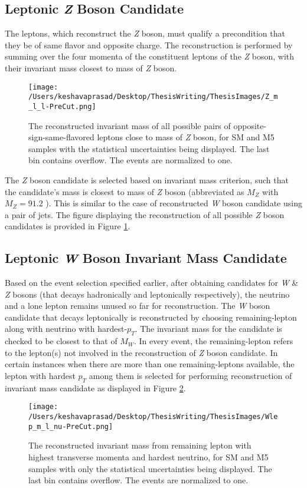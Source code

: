 \subsection{Leptonic \textit{Z} Boson Candidate}
 The leptons, which reconstruct the \textit{Z} boson, must qualify a precondition that they be of same flavor and opposite charge. The reconstruction is performed by summing over the four momenta of the constituent leptons of the \textit{Z} boson, with their invariant mass closest to mass of \textit{Z} boson.
\begin{figure}[!htb]%
	\centering
	\texttt{[image: /Users/keshavaprasad/Desktop/ThesisWriting/ThesisImages/Z\_m\_l\_l-PreCut.png]}
	\caption{The reconstructed invariant mass of all possible  pairs of opposite-sign-same-flavored leptons close to mass of \textit{Z} boson, for SM and M5 samples with the statistical uncertainties being displayed. The last bin contains overflow. The events are normalized to one.}
	\label{Z Candidate Mass-PreCut}
\end{figure}
The \textit{Z} boson candidate is selected based on invariant mass criterion, such that the candidate's mass is closest to mass of \textit{Z} boson (abbreviated as \texttt{$M_{Z}$} with \texttt{$M_{Z}=91.2$}  \cite{pdg2010}). This is similar to the case of reconstructed \textit{W} boson candidate using a pair of jets. The figure displaying the reconstruction of all possible \textit{Z} boson candidates is provided in Figure  \ref{Z Candidate Mass-PreCut}.

\subsection{Leptonic \textit{W} Boson Invariant Mass Candidate}
Based on the event selection specified earlier, after obtaining candidates for \textit{W} \& \textit{Z} bosons (that decays hadronically and leptonically respectively), the neutrino and a lone lepton remains unused so far for reconstruction. The \textit{W} boson candidate that decays leptonically is reconstructed by choosing remaining-lepton along with neutrino with hardest-$p_{T}$. The invariant mass for the candidate is checked to be closest to that of \texttt{$M_{W}$}. In every event, the remaining-lepton refers to the lepton(s) not involved in the reconstruction of \textit{Z} boson candidate. In certain instances when there are more than one remaining-leptons available, the lepton with hardest $p_{T}$ among them is selected for performing reconstruction of invariant mass candidate as displayed in Figure \ref{Lep Candidate-PreCut}.
\begin{figure}[!htb]%
	\centering
	\texttt{[image: /Users/keshavaprasad/Desktop/ThesisWriting/ThesisImages/Wlep\_m\_l\_nu-PreCut.png]}
	\caption{The reconstructed invariant mass from remaining lepton with highest transverse momenta and hardest neutrino, for SM and M5 samples with only the statistical uncertainties being displayed. The last bin contains overflow. The events are normalized to one.}
	\label{Lep Candidate-PreCut}
\end{figure}

